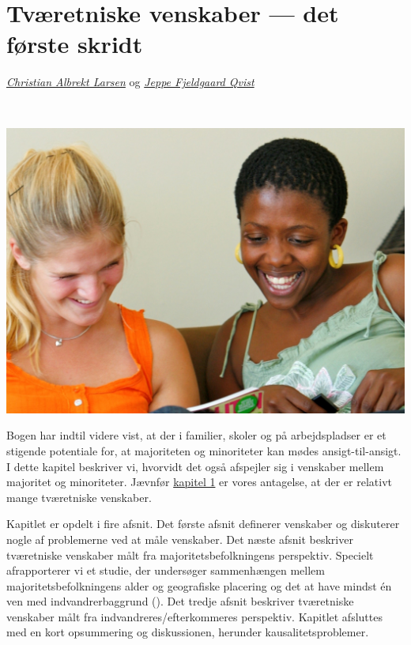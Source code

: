 \documentclass[
]{book}
\begin{document}
\newpage
\thispagestyle{empty}

\chapter{Tværetniske venskaber --- det første skridt}\label{kap6}

\thispagestyle{empty}

\emph{\href{https://vbn.aau.dk/en/persons/albrekt}{Christian Albrekt Larsen}} og \emph{\href{https://vbn.aau.dk/da/persons/jeppefl}{Jeppe Fjeldgaard Qvist}}

~~~~

\includegraphics[width=1\linewidth]{images/kap71}

\newpage

Bogen har indtil videre vist, at der i familier, skoler og på arbejdspladser er et stigende potentiale for, at majoriteten og minoriteter kan mødes ansigt-til-ansigt. I dette kapitel beskriver vi, hvorvidt det også afspejler sig i venskaber mellem majoritet og minoriteter. Jævnfør \hyperref[kap1]{kapitel 1} er vores antagelse, at der er relativt mange tværetniske venskaber.

Kapitlet er opdelt i fire afsnit. Det første afsnit definerer venskaber og diskuterer nogle af problemerne ved at måle venskaber. Det næste afsnit beskriver tværetniske venskaber målt fra majoritetsbefolkningens perspektiv. Specielt afrapporterer vi et studie, der undersøger sammenhængen mellem majoritetsbefolkningens alder og geografiske placering og det at have mindst én ven med indvandrerbaggrund (). Det tredje afsnit beskriver tværetniske venskaber målt fra indvandreres/efterkommeres perspektiv. Kapitlet afsluttes med en kort opsummering og diskussionen, herunder kausalitetsproblemer.
\end{document}
